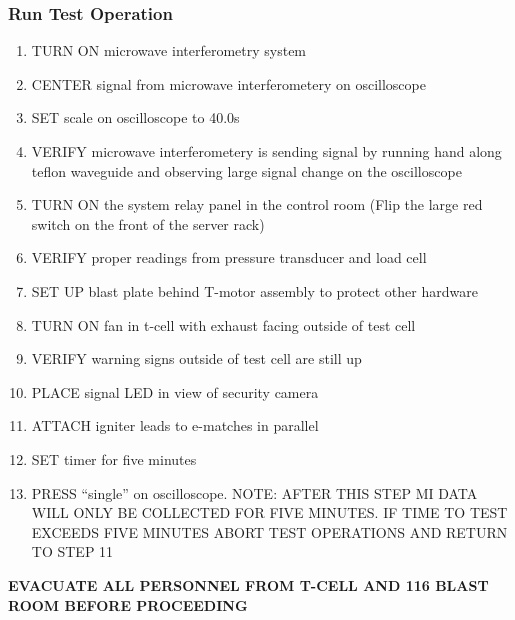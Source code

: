 \subsubsection*{Run Test Operation}
\begin{enumerate}
    \item TURN ON microwave interferometry system
    \item CENTER signal from microwave interferometery on oscilloscope
    \item SET scale on oscilloscope to 40.0s
    \item VERIFY microwave interferometery is sending signal by running hand along teflon waveguide and observing large signal change on the oscilloscope
    \item TURN ON the system relay panel in the control room (Flip the large red switch on the front of the server rack)
    \item VERIFY proper readings from pressure transducer and load cell
    \item SET UP blast plate behind T-motor assembly to protect other hardware
    \item TURN ON fan in t-cell with exhaust facing outside of test cell
    \item VERIFY warning signs outside of test cell are still up
    \item PLACE signal LED in view of security camera
    \item ATTACH igniter leads to e-matches in parallel
    \item SET timer for five minutes
    \item PRESS ``single'' on oscilloscope. NOTE: AFTER THIS STEP MI DATA WILL ONLY BE COLLECTED FOR FIVE MINUTES. IF TIME TO TEST EXCEEDS FIVE MINUTES ABORT TEST OPERATIONS AND RETURN TO STEP 11
\end{enumerate}
\textbf{EVACUATE ALL PERSONNEL FROM T-CELL AND 116 BLAST ROOM BEFORE PROCEEDING}
